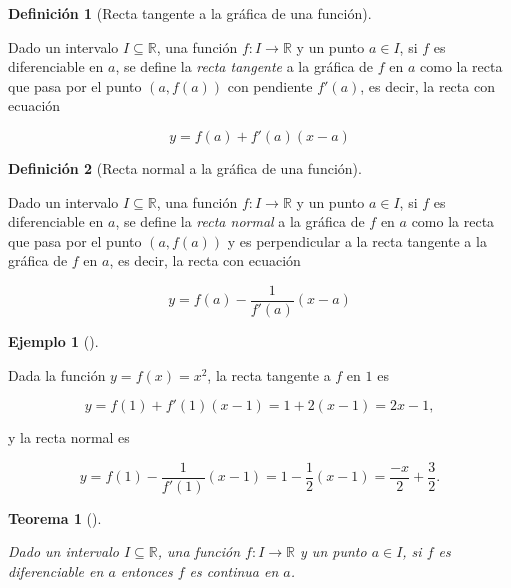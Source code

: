 \documentclass[
  a4paper,
]{scrreport}
\theoremstyle{definition}
\newtheorem{example}{Ejemplo}[chapter]
\theoremstyle{plain}
\theoremstyle{definition}
\newtheorem{definition}{Definición}[chapter]
\theoremstyle{definition}
\theoremstyle{plain}
\newtheorem{theorem}{Teorema}[chapter]
\theoremstyle{plain}
\theoremstyle{remark}
\begin{document}
\begin{definition}[Recta tangente a la gráfica de una
función]\protect\hypertarget{def-tangente-funcion}{}\label{def-tangente-funcion}

Dado un intervalo \(I\subseteq\mathbb{R}\), una función
\(f:I\to\mathbb{R}\) y un punto \(a\in I\), si \(f\) es diferenciable en
\(a\), se define la \emph{recta tangente} a la gráfica de \(f\) en \(a\)
como la recta que pasa por el punto \((a,f(a))\) con pendiente
\(f'(a)\), es decir, la recta con ecuación

\[
y=f(a)+f'(a)(x-a)
\]

\end{definition}

\begin{definition}[Recta normal a la gráfica de una
función]\protect\hypertarget{def-normal-funcion}{}\label{def-normal-funcion}

Dado un intervalo \(I\subseteq\mathbb{R}\), una función
\(f:I\to\mathbb{R}\) y un punto \(a\in I\), si \(f\) es diferenciable en
\(a\), se define la \emph{recta normal} a la gráfica de \(f\) en \(a\)
como la recta que pasa por el punto \((a,f(a))\) y es perpendicular a la
recta tangente a la gráfica de \(f\) en \(a\), es decir, la recta con
ecuación

\[
y=f(a)-\frac{1}{f'(a)}(x-a)
\]

\end{definition}

\begin{example}[]\protect\hypertarget{exm-tangente-normal-funcion}{}\label{exm-tangente-normal-funcion}

Dada la función \(y=f(x)=x^2\), la recta tangente a \(f\) en \(1\) es

\[
y = f(1)+f'(1)(x-1) = 1+2(x-1) = 2x-1,
\]

y la recta normal es

\[
y = f(1)-\frac{1}{f'(1)}(x-1) = 1-\frac{1}{2}(x-1) = \frac{-x}{2}+\frac{3}{2}.
\]

\end{example}

\begin{theorem}[]\protect\hypertarget{thm-diferenciabilidad-implica-continuidad}{}\label{thm-diferenciabilidad-implica-continuidad}

Dado un intervalo \(I\subseteq\mathbb{R}\), una función
\(f:I\to\mathbb{R}\) y un punto \(a\in I\), si \(f\) es diferenciable en
\(a\) entonces \(f\) es continua en \(a\).

\end{theorem}
\end{document}
